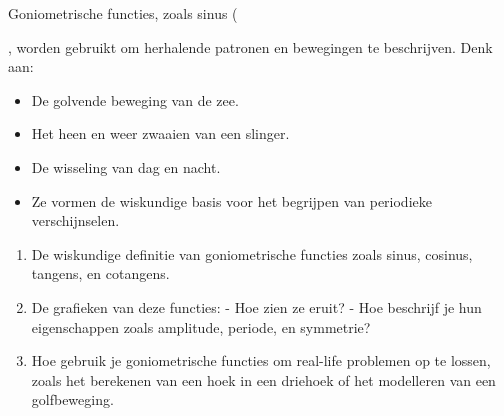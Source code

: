 \documentclass{ximera}
\begin{document}

Goniometrische functies, zoals sinus (


, worden gebruikt om herhalende patronen en bewegingen te beschrijven. Denk aan:
\begin{itemize}
    \item De golvende beweging van de zee.
    \item Het heen en weer zwaaien van een slinger.
    \item De wisseling van dag en nacht.
    \item Ze vormen de wiskundige basis voor het begrijpen van periodieke verschijnselen.
\end{itemize}

\begin{template}
    \begin{enumerate}
        \item De wiskundige definitie van goniometrische functies zoals sinus, cosinus, tangens, en cotangens.
        \item De grafieken van deze functies:
        - Hoe zien ze eruit?
        - Hoe beschrijf je hun eigenschappen zoals amplitude, periode, en symmetrie?
        \item Hoe gebruik je goniometrische functies om real-life problemen op te lossen, zoals het berekenen van een hoek in een driehoek of het modelleren van een golfbeweging.   
    \end{enumerate}
 
\end{template}
\end{document}
